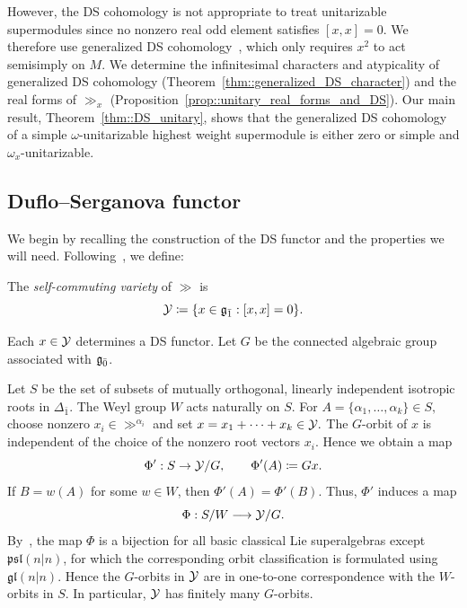 However, the DS cohomology is not appropriate to treat unitarizable supermodules since no nonzero real odd element satisfies $[x,x]=0$. We therefore use generalized DS cohomology~\cite{GorelikSherman2024,Sherman2025}, which only requires $x^2$ to act semisimply on $M$. We determine the infinitesimal characters and atypicality of generalized DS cohomology (Theorem~\ref{thm::generalized_DS_character}) and the real forms of $\gg_x$ (Proposition~\ref{prop::unitary_real_forms_and_DS}). Our main result, Theorem~\ref{thm::DS_unitary}, shows that the generalized DS cohomology of a simple $\omega$-unitarizable highest weight supermodule is either zero or simple and $\omega_x$-unitarizable.


\subsection{Duflo--Serganova functor}
We begin by recalling the construction of the DS functor and the properties we will need. Following~\cite{duflo2005associated,gorelik2022duflo}, we define:

\begin{definition}
The \emph{self-commuting variety} of $\gg$ is
\[
{\mathcal Y}\coloneqq \{x \in {\mathfrak{g}_{\bar{1}}} : [x,x]=0\}.
\]
\end{definition}

Each $x\in{\mathcal Y}$ determines a DS functor. Let $G$ be the connected algebraic group associated with ${\mathfrak{g}_{\bar{0}}}$.



Let $S$ be the set of subsets of mutually orthogonal, linearly independent isotropic roots in $\Delta_{\bar{1}}$. The Weyl group $W$ acts naturally on $S$. For
$
A=\{\alpha_{1},\dots,\alpha_{k}\}\in S,
$
choose nonzero $x_{i}\in\gg^{\alpha_{i}}$ and set
$
x=x_{1}+\dots+x_{k}\in{\mathcal Y}.
$
The $G$-orbit of $x$ is independent of the choice of the nonzero root vectors $x_{i}$. Hence we obtain a map
\begin{equation}
\Phi':S\to{\mathcal Y}/G, \qquad \Phi'(A)\coloneqq Gx.
\end{equation}
If $B=w(A)$ for some $w\in W$, then $\Phi'(A)=\Phi'(B)$. Thus, $\Phi'$ induces a map
\begin{equation}
\Phi:S/W\longrightarrow{\mathcal Y}/G.
\end{equation}
By~\cite[Theorem~4.2]{duflo2005associated}, the map $\Phi$ is a bijection for all basic classical Lie superalgebras except $\mathfrak{psl}(n\vert n)$, for which the corresponding orbit classification is formulated using $\mathfrak{gl}(n\vert n)$. Hence the $G$-orbits in ${\mathcal Y}$ are in one-to-one correspondence with the $W$-orbits in $S$. In particular, ${\mathcal Y}$ has finitely many $G$-orbits.

